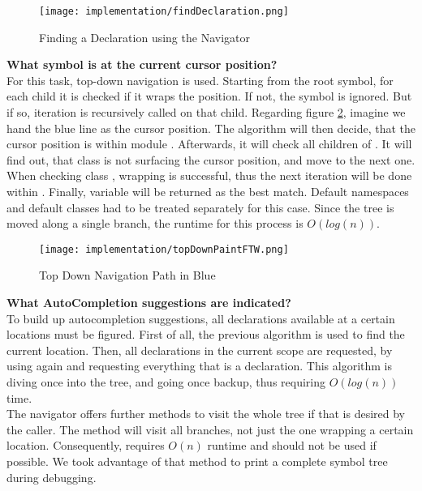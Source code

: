 \begin{figure}[H]
    \centering
    \texttt{[image: implementation/findDeclaration.png]}
    \caption{Finding a Declaration using the Navigator}
    \label{fig:findDecl}
\end{figure}

\textbf{What symbol is at the current cursor position?}\\
For this task, top-down navigation is used.
Starting from the root symbol, for each child it is checked if it wraps the position.
If not, the symbol is ignored.
But if so, iteration is recursively called on that child.
Regarding figure \ref{fig:topDownPaintFTW}, imagine we hand the blue line as the cursor position.
The algorithm will then decide, that the cursor position is within module .
Afterwards, it will check all children of .
It will find out, that class  is not surfacing the cursor position, and move to the next one.
When checking class , wrapping is successful, thus the next iteration will be done within .
Finally, variable  will be returned as the best match.
Default namespaces and default classes had to be treated separately for this case.
Since the tree is moved along a single branch, the runtime for this process is $O(log(n))$.\\

\begin{figure}[H]
    \centering
    \texttt{[image: implementation/topDownPaintFTW.png]}
    \caption{Top Down Navigation Path in Blue}
    \label{fig:topDownPaintFTW}
\end{figure}

\textbf{What AutoCompletion suggestions are indicated?}\\
To build up autocompletion suggestions, all declarations available at a certain locations must be figured.
First of all, the previous  algorithm is used to find the current location.
Then, all declarations in the current scope are requested, by using  again and requesting everything that is a declaration.
This algorithm is diving once into the tree, and going once backup, thus requiring $O(log(n))$ time.\\

The navigator offers further methods to visit the whole tree if that is desired by the caller.
The method  will visit all branches, not just the one wrapping a certain location.
Consequently,  requires $O(n)$ runtime and should not be used if possible.
We took advantage of that method to print a complete symbol tree during debugging.

